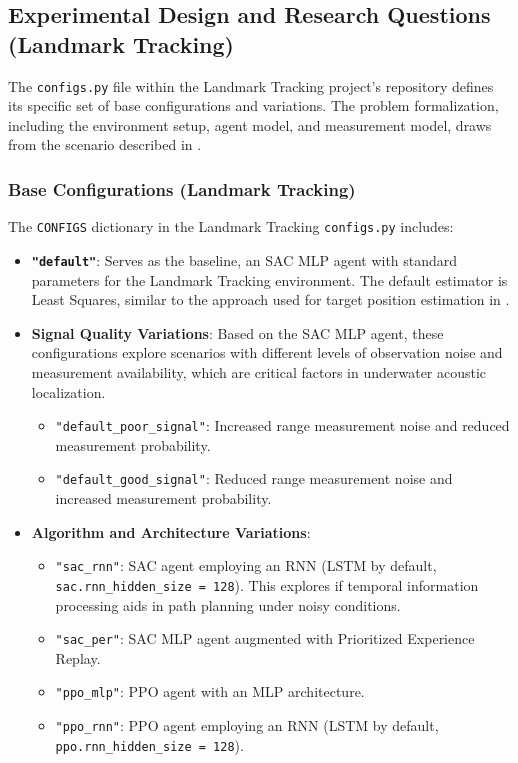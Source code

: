 \documentclass[11pt,a4paper]{article}
\newcommand{\code}[1]{\texttt{#1}} %
\begin{document}
\subsection{Experimental Design and Research Questions (Landmark Tracking)}
\label{sec:experimental_design_landmark_tracker}
The \code{configs.py} file within the Landmark Tracking project's repository defines its specific set of base configurations and variations. The problem formalization, including the environment setup, agent model, and measurement model, draws from the scenario described in \cite{masmitja2023tracking}.

\subsubsection{Base Configurations (Landmark Tracking)}
The \code{CONFIGS} dictionary in the Landmark Tracking \code{configs.py} includes:
\begin{itemize}
    \item \textbf{\code{"default"}}: Serves as the baseline, an SAC MLP agent with standard parameters for the Landmark Tracking environment. The default estimator is Least Squares, similar to the approach used for target position estimation in \cite{masmitja2023tracking}.
    \item \textbf{Signal Quality Variations}: Based on the SAC MLP agent, these configurations explore scenarios with different levels of observation noise and measurement availability, which are critical factors in underwater acoustic localization.
        \begin{itemize}
            \item \code{"default\_poor\_signal"}: Increased range measurement noise and reduced measurement probability.
            \item \code{"default\_good\_signal"}: Reduced range measurement noise and increased measurement probability.
        \end{itemize}
    \item \textbf{Algorithm and Architecture Variations}:
        \begin{itemize}
            \item \code{"sac\_rnn"}: SAC agent employing an RNN (LSTM by default, \code{sac.rnn\_hidden\_size = 128}). This explores if temporal information processing aids in path planning under noisy conditions.
            \item \code{"sac\_per"}: SAC MLP agent augmented with Prioritized Experience Replay.
            \item \code{"ppo\_mlp"}: PPO agent with an MLP architecture.
            \item \code{"ppo\_rnn"}: PPO agent employing an RNN (LSTM by default, \code{ppo.rnn\_hidden\_size = 128}).
        \end{itemize}
\end{itemize}
\end{document}
